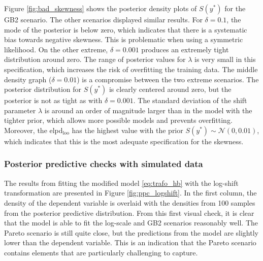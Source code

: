 Figure \ref{fig:bad_skewness} shows the posterior density plots of $S(y^*)$ for the GB2 scenario.
The other scenarios displayed similar results.
For $\delta = 0.1$, the mode of the posterior is below zero, which indicates that there is a systematic bias towards negative skewness.
This is problematic when using a symmetric likelihood.
On the other extreme, $\delta = 0.001$ produces an extremely tight distribution around zero.
The range of posterior values for $\lambda$ is very small in this specification, which increases the risk of overfitting the training data.
The middle density graph ($\delta = 0.01$) is a compromise between the two extreme scenarios.
The posterior distribution for $S(y^*)$ is clearly centered around zero, but the posterior is not as tight as with $\delta = 0.001$.
The standard deviation of the shift parameter $\lambda$ is around an order of magnitude larger than in the model with the tighter prior, which allows more possible models and prevents overfitting.
Moreover, the elpd$_{\text{loo}}$ has the highest value with the prior $S(y^*) \sim \mathcal N(0, 0.01)$, which indicates that this is the most adequate specification for the skewness.



\subsubsection{Posterior predictive checks with simulated data}
The results from fitting the modified model \ref{eq:trafo_hb} with the log-shift transformation are presented in Figure \ref{fig:ppc_logshift}.
In the first column, the density of the dependent variable is overlaid with the densities from 100 samples from the posterior predictive distribution.
From this first visual check, it is clear that the model is able to fit the log-scale and GB2 scenarios reasonably well.
The Pareto scenario is still quite close, but the predictions from the model are slightly lower than the dependent variable.
This is an indication that the Pareto scenario contains elements that are particularly challenging to capture.


